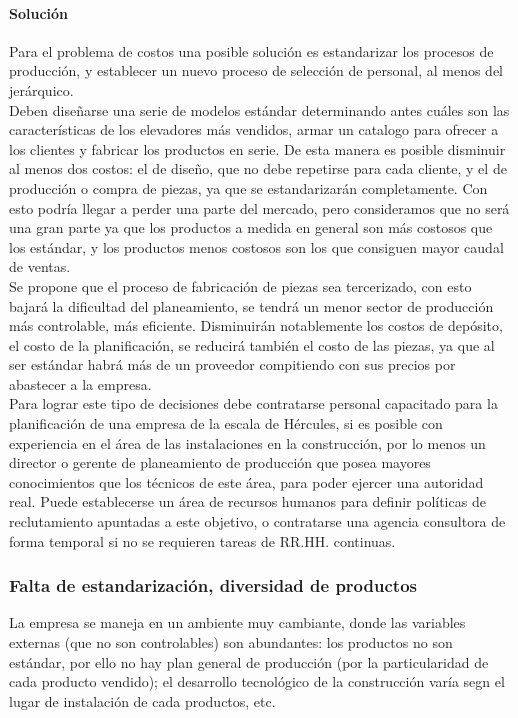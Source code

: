 \paragraph{Soluci\'on}
Para el problema de costos una posible soluci\'on es estandarizar los procesos de producci\'on, y establecer un nuevo proceso de selecci\'on de personal, al menos del jer\'arquico.\\
Deben dise\~narse una serie de modelos est\'andar determinando antes cu\'ales son las caracter\'isticas de los elevadores m\'as vendidos, armar un catalogo para ofrecer a los clientes y fabricar los productos en serie. De esta manera es posible disminuir al menos dos costos: el de dise\~no, que no debe repetirse para cada cliente, y el de producci\'on o compra de piezas, ya que se estandarizar\'an completamente. Con esto podr\'ia llegar a perder una parte del mercado, pero consideramos que no ser\'{a} una gran parte ya que los productos a medida en general son m\'as costosos que los est\'andar, y los productos menos costosos son los que consiguen mayor caudal de ventas.\\
Se propone que el proceso de fabricaci\'on de piezas sea tercerizado, con esto bajar\'a la dificultad del planeamiento, se tendr\'{a} un menor sector de producci\'on m\'{a}s controlable, m\'as eficiente. Disminuir\'an notablemente los costos de dep\'osito, el costo de la planificaci\'on, se reducir\'a tambi\'en el costo de las piezas, ya que al ser est\'andar habr\'a m\'as de un proveedor compitiendo con sus precios por abastecer a la empresa.\\
Para lograr este tipo de decisiones debe contratarse personal capacitado para la planificaci\'on de una empresa de la escala de H\'ercules, si es posible con experiencia en el \'area de las instalaciones en la construcci\'on, por lo menos un director o gerente de planeamiento de producci\'on que posea mayores conocimientos que los t\'ecnicos de este \'area, para poder ejercer una autoridad real. Puede establecerse un \'area de recursos humanos para definir pol\'iticas de reclutamiento apuntadas a este objetivo, o contratarse una agencia consultora de forma temporal si no se requieren tareas de RR.HH. continuas.

\subsubsection{Falta de estandarizaci\'on, diversidad de productos}
La empresa se maneja en un ambiente muy cambiante, donde las variables externas (que no son controlables) son abundantes: los productos no son est\'andar, por ello no hay plan general de producci\'on (por la particularidad de cada producto vendido); el desarrollo tecnol\'ogico de la construcci\'on var\'ia segn el lugar de instalaci\'on de cada productos, etc.
